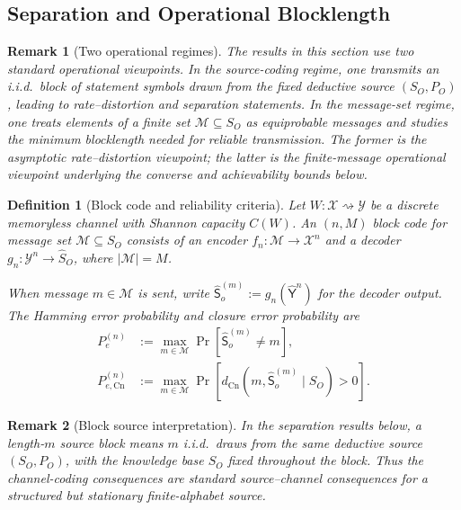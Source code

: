 \documentclass[journal,onecolumn]{IEEEtran}
\newcommand{\Cn}{\text{Cn}}
\newtheorem{definition}{Definition}[section]
\newtheorem{remark}{Remark}[section]
\numberwithin{equation}{section}
\begin{document}
\subsection{Separation and Operational Blocklength}
\label{subsec:separation}

\begin{remark}[Two operational regimes]
\label{rem:two-operational-regimes}
The results in this section use two standard operational viewpoints.
In the \emph{source-coding regime}, one transmits an i.i.d.\ block of
statement symbols drawn from the fixed deductive source
\((S_O,P_O)\), leading to rate--distortion and separation statements.
In the \emph{message-set regime}, one treats elements of a finite set
\(\mathcal M\subseteq S_O\) as equiprobable messages and studies the
minimum blocklength needed for reliable transmission.
The former is the asymptotic rate--distortion viewpoint; the latter is
the finite-message operational viewpoint underlying the converse and
achievability bounds below.
\end{remark}

\begin{definition}[Block code and reliability criteria]
\label{def:semantic-codebook}
Let \(W:\mathcal X\rightsquigarrow\mathcal Y\) be a discrete
memoryless channel with Shannon capacity \(C(W)\).
An \emph{\((n,M)\) block code} for message set
\(\mathcal M\subseteq S_O\) consists of an encoder
\(f_n:\mathcal M\to\mathcal X^n\) and a decoder
\(g_n:\mathcal Y^n\to\hat S_O\), where \(|\mathcal M|=M\).

When message \(m\in\mathcal M\) is sent, write
\(\hat{\mathsf S}_o^{(m)}:=g_n(\hat{\mathsf Y}^n)\) for the
decoder output.
The \emph{Hamming error probability} and
\emph{closure error probability} are
\begin{align}
  P_e^{(n)}
  &:=\max_{m\in\mathcal M}
  \Pr[\hat{\mathsf S}_o^{(m)}\neq m],
  \label{eq:hamming-error-def}\\
  P_{e,\Cn}^{(n)}
  &:=\max_{m\in\mathcal M}
  \Pr[d_{\Cn}(m,\hat{\mathsf S}_o^{(m)}\mid S_O)>0].
  \label{eq:closure-error-def}
\end{align}
\end{definition}

\begin{remark}[Block source interpretation]
\label{rem:block-source-interpretation}
In the separation results below, a length-\(m\) source block means
\(m\) i.i.d.\ draws from the same deductive source \((S_O,P_O)\),
with the knowledge base \(S_O\) fixed throughout the block.
Thus the channel-coding consequences are standard source--channel
consequences for a structured but stationary finite-alphabet source.
\end{remark}
\end{document}
